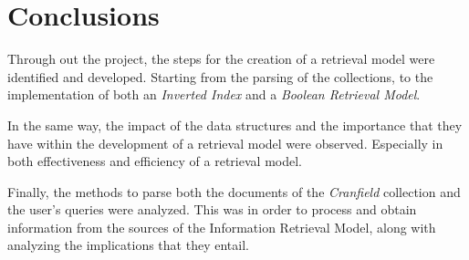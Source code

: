 \documentclass{article}
\begin{document}

\section{Conclusions}

Through out the project, the steps for the creation of a retrieval model were identified and developed. Starting from the parsing of the collections, to the implementation of both an \textit{Inverted Index} and a \textit{Boolean Retrieval Model}.

In the same way, the impact of the data structures and the importance that they have within the development of a retrieval model were observed. Especially in both effectiveness and efficiency of a retrieval model.

Finally, the methods to parse both the documents of the \textit{Cranfield} collection and the user's queries were analyzed. This was in order to process and obtain information from the sources of the Information Retrieval Model, along with analyzing the implications that they entail.

\end{document}
